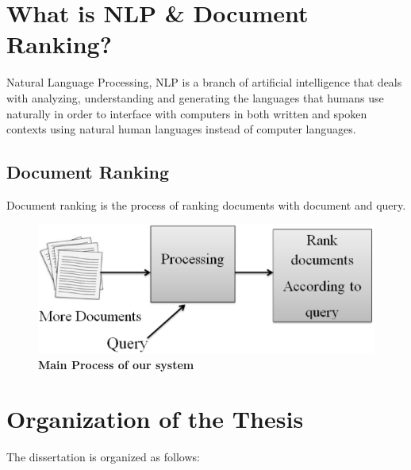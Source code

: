 \section{What is NLP \& Document Ranking?}

Natural Language Processing, NLP is a branch of artificial intelligence that deals with analyzing, understanding and generating the languages that humans use naturally in order to interface with computers in both written and spoken contexts using natural human languages instead of computer languages.

\subsection{Document Ranking}

Document ranking is the process of ranking documents with document and query.

\begin{figure}[htp]
	\centering
		\includegraphics[width=.65\textwidth]{figure/one.eps}
	\caption{\textbf{Main Process of our system}}
	\label{Figure:process}
\end{figure}





\section{Organization of the Thesis}
%
The dissertation is organized as follows: 


